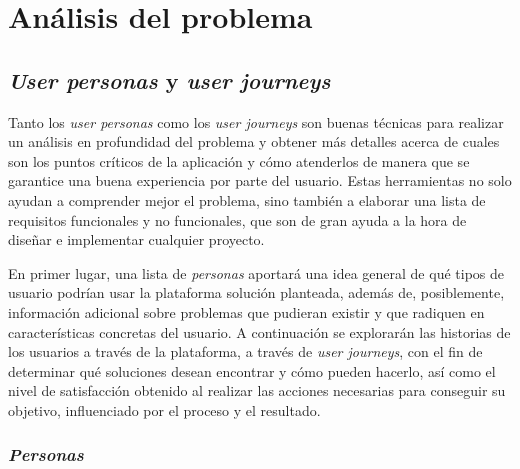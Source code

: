 \chapter{Análisis del problema}

\section{\textit{User personas} y \textit{user journeys}}

Tanto los \textit{user personas}\cite{personas} como los \textit{user journeys}\cite{userjourney} son buenas técnicas para realizar un análisis en profundidad del problema y obtener más detalles acerca de cuales son los puntos críticos de la aplicación y cómo atenderlos de manera que se garantice una buena experiencia por parte del usuario. Estas herramientas no solo ayudan a comprender mejor el problema, sino también a elaborar una lista de requisitos funcionales y no funcionales, que son de gran ayuda a la hora de diseñar e implementar cualquier proyecto.

En primer lugar, una lista de \textit{personas} aportará una idea general de qué tipos de usuario podrían usar la plataforma solución planteada, además de, posiblemente, información adicional sobre problemas que pudieran existir y que radiquen en características concretas del usuario. A continuación se explorarán las historias de los usuarios a través de la plataforma, a través de \textit{user journeys}, con el fin de determinar qué soluciones desean encontrar y cómo pueden hacerlo, así como el nivel de satisfacción obtenido al realizar las acciones necesarias para conseguir su objetivo, influenciado por el proceso y el resultado. 

\subsection{\textit{Personas}}

